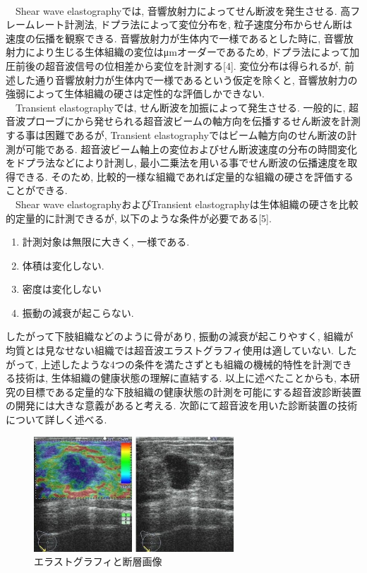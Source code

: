\\\ \ Shear wave elastographyでは, 音響放射力によってせん断波を発生させる. 高フレームレート計測法, ドプラ法によって変位分布を, 粒子速度分布からせん断は速度の伝播を観察できる. 音響放射力が生体内で一様であるとした時に, 音響放射力により生じる生体組織の変位はμmオーダーであるため, ドプラ法によって加圧前後の超音波信号の位相差から変位を計測する[4]. 変位分布は得られるが, 前述した通り音響放射力が生体内で一様であるという仮定を除くと, 音響放射力の強弱によって生体組織の硬さは定性的な評価しかできない.
\\\ \ Transient elastographyでは, せん断波を加振によって発生させる. 一般的に, 超音波プローブにから発せられる超音波ビームの軸方向を伝播するせん断波を計測する事は困難であるが, Transient elastographyではビーム軸方向のせん断波の計測が可能である. 超音波ビーム軸上の変位およびせん断波速度の分布の時間変化をドプラ法などにより計測し, 最小二乗法を用いる事でせん断波の伝播速度を取得できる. そのため, 比較的一様な組織であれば定量的な組織の硬さを評価することができる. 
\\\ \ Shear wave elastographyおよびTransient elastographyは生体組織の硬さを比較的定量的に計測できるが, 以下のような条件が必要である[5].
\begin{enumerate}
   \item 計測対象は無限に大きく, 一様である.
   \item 体積は変化しない. 
   \item 密度は変化しない
   \item 振動の減衰が起こらない. 
\end{enumerate}
したがって下肢組織などのように骨があり, 振動の減衰が起こりやすく, 組織が均質とは見なせない組織では超音波エラストグラフィ使用は適していない. したがって, 上述したような4つの条件を満たさずとも組織の機械的特性を計測できる技術は, 生体組織の健康状態の理解に直結する. 以上に述べたことからも, 本研究の目標である定量的な下肢組織の健康状態の計測を可能にする超音波診断装置の開発には大きな意義があると考える. 次節にて超音波を用いた診断装置の技術について詳しく述べる. 
\begin{figure}[h]
  \begin{center}
    \includegraphics[width=75mm]{fig/echo02.jpg}
  \end{center}
  \caption{エラストグラフィと断層画像}
\end{figure}

